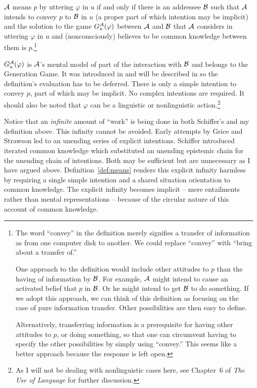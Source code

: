 \begin{definition}

$\cal A$ means $p$ by uttering $\varphi$ in $u$ if and only if there is an addressee $\cal B$ such that $\cal A$ intends to convey $p$ to $\cal B$ in $u$ (a proper part of which intention may be implicit) and the solution to the game $G^{\cal A}_u(\varphi)$ between $\cal A$ and $\cal B$ that $\cal A$ considers in uttering $\varphi$ in $u$ and (nonconsciously) believes to be common knowledge between them is $p$.\footnote{The word ``convey'' in the definition merely signifies a transfer of information as from one computer disk to another.  We could replace ``convey'' with ``bring about a transfer of.''

One approach to the definition would include other attitudes to
$p$ than the having of information by $\cal B$.  For example, $\cal A$
might intend to cause an activated belief that $p$ in $\cal B$.  Or he might
intend to get $\cal B$ to do something.  If we adopt this approach, we can think of this definition as focusing on the case of pure information transfer.  Other possibilities are then easy to define.  

Alternatively, transferring information is a prerequisite for having other attitudes to $p$, or doing something, so that one can circumvent having to specify the other
possibilities by simply using ``convey.''  This seems like a better approach
because the response is left open.}

\label{def:means}
\end{definition}

$G^{\cal A}_u(\varphi)$ is $\cal A$'s mental model of part of the interaction with $\cal B$ and belongs to the Generation Game. It was introduced in  and will be described in  so the definition's evaluation has to be deferred. There is only a simple intention to convey $p$, part of which may be implicit. No complex intentions are required. It should also be noted that $\varphi$ can be a linguistic or nonlinguistic action.\footnote{As I will not be dealing with nonlinguistic cases here, see Chapter~6 of \emph{The Use of Language} for further discussion.}

Notice that an \emph{infinite} amount of ``work'' is being done in both Schiffer's and my definition above. This infinity cannot be avoided. Early attempts by Grice and Strawson led to an unending series of explicit intentions. Schiffer introduced iterated common knowledge which substituted an unending epistemic chain for the unending chain of intentions. Both may be sufficient but are unnecessary as I have argued above. Definition~\ref{def:means} renders this explicit infinity harmless by requiring a single simple intention and a shared situation orientation to common knowledge. The explicit infinity becomes implicit -- mere entailments rather than mental representations -- because of the circular nature of this account of common knowledge. 

